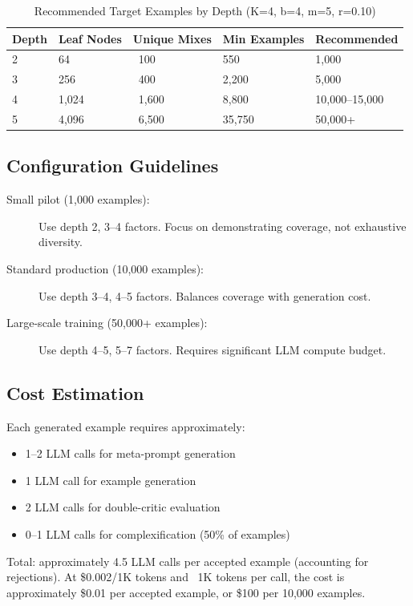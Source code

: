\documentclass[12pt,a4paper,twoside]{report}
\begin{document}
\begin{table}[H]
\centering
\caption{Recommended Target Examples by Depth (K=4, b=4, m=5, r=0.10)}
\label{tab:target-by-depth}
\begin{tabular}{lllll}
\toprule
\textbf{Depth} & \textbf{Leaf Nodes} & \textbf{Unique Mixes} & \textbf{Min Examples} & \textbf{Recommended} \\
\midrule
2 & 64 & ~100 & 550 & 1,000 \\
3 & 256 & ~400 & 2,200 & 5,000 \\
4 & 1,024 & ~1,600 & 8,800 & 10,000--15,000 \\
5 & 4,096 & ~6,500 & 35,750 & 50,000+ \\
\bottomrule
\end{tabular}
\end{table}

\subsection{Configuration Guidelines}

\begin{description}
\item[Small pilot (1,000 examples):] Use depth 2, 3--4 factors. Focus on
demonstrating coverage, not exhaustive diversity.
\item[Standard production (10,000 examples):] Use depth 3--4, 4--5 factors.
Balances coverage with generation cost.
\item[Large-scale training (50,000+ examples):] Use depth 4--5, 5--7 factors.
Requires significant LLM compute budget.
\end{description}

\subsection{Cost Estimation}

Each generated example requires approximately:
\begin{itemize}
\item 1--2 LLM calls for meta-prompt generation
\item 1 LLM call for example generation
\item 2 LLM calls for double-critic evaluation
\item 0--1 LLM calls for complexification (50\% of examples)
\end{itemize}

\noindent
Total: approximately 4.5 LLM calls per accepted example (accounting for rejections).
At \$0.002/1K tokens and ~1K tokens per call, the cost is approximately
\$0.01 per accepted example, or \$100 per 10,000 examples.
\end{document}
